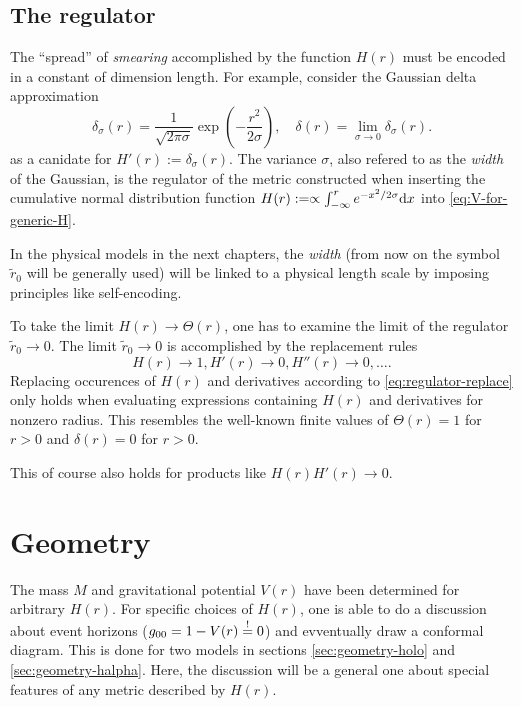\documentclass[12pt,a4paper]{report}
\numberwithin{equation}{chapter}
\begin{document}
\subsection{The regulator}\label{sec:regulator}
The ``spread'' of \emph{smearing} accomplished by the function $H(r)$ must be encoded in a constant of dimension length. For example, consider the Gaussian delta approximation
\begin{equation}
\delta_\sigma(r) = \frac{1}{\sqrt{2\pi\sigma}} \exp \left( - \frac{r^2}{2\sigma} \right),
\quad \delta(r) = \lim_{\sigma \to 0} \delta_\sigma(r).
\end{equation}
as a canidate for $H'(r) := \delta_\sigma(r)$. The variance $\sigma$, also refered to as the \emph{width} of the Gaussian, is the regulator of the metric constructed when inserting the cumulative normal distribution function $H(r) := \propto \int_{-\infty}^r e^{-x^2 / 2\sigma} \mathrm{d} x$ into \eqref{eq:V-for-generic-H}.

In the physical models in the next chapters, the \emph{width} (from now on the symbol $\tilde r_0$ will be generally used) will be linked to a physical length scale by imposing principles like self-encoding.

To take the limit $H(r) \to \Theta(r)$, one has to examine the limit of the regulator $\tilde r_0 \to 0$. The limit $\tilde r_0 \to 0$ is accomplished by the replacement rules
\begin{equation}\label{eq:regulator-replace}
H(r)\to 1, H'(r) \to 0, H''(r) \to 0, \dots.
\end{equation}
Replacing occurences of $H(r)$ and derivatives according to \eqref{eq:regulator-replace} only holds when evaluating expressions containing $H(r)$ and derivatives for nonzero radius. This resembles the well-known finite values of $\Theta(r)=1$ for $r>0$ and $\delta(r)=0$ for $r>0$.

This of course also holds for products like $H(r)H'(r)\to 0$.

\section{Geometry}
The mass $M$ and gravitational potential $V(r)$ have been determined for arbitrary $H(r)$. For specific choices of $H(r)$, one is able to do a discussion about event horizons ($g_{00} = 1 - V(r) \stackrel{!}{=} 0$) and evventually draw a conformal diagram. This is done for two models in sections \ref{sec:geometry-holo} and \ref{sec:geometry-halpha}. Here, the discussion will be a general one about special features of any metric described by $H(r)$.
\end{document}
